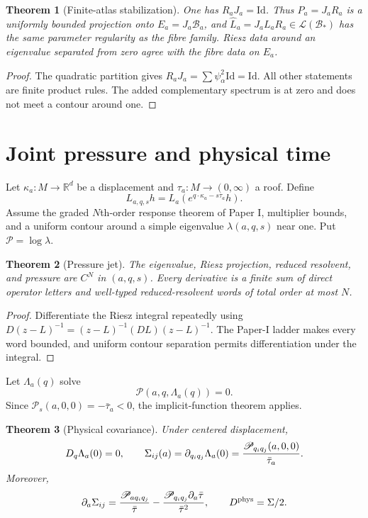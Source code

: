 \documentclass[11pt,reqno]{amsart}
\newtheorem{theorem}{Theorem}[section]
\theoremstyle{definition}
\theoremstyle{remark}
\newcommand{\B}{\mathcal B}
\newcommand{\R}{\mathbb R}
\newcommand{\Id}{\mathrm{Id}}
\begin{document}
\begin{theorem}[Finite-atlas stabilization]\label{thm:bundle}
One has $R_aJ_a=\Id$.  Thus $P_a=J_aR_a$ is a uniformly bounded projection
onto $E_a=J_a\B_a$, and
$\widehat L_a=J_aL_aR_a\in\mathcal L(\B_*)$ has the same parameter
regularity as the fibre family.  Riesz data around an eigenvalue separated
from zero agree with the fibre data on $E_a$.
\end{theorem}

\begin{proof}
The quadratic partition gives $R_aJ_a=\sum\psi_\alpha^2\Id=\Id$.
All other statements are finite product rules.  The added complementary
spectrum is at zero and does not meet a contour around one.
\end{proof}

\section{Joint pressure and physical time}\label{sec:pressure}
Let $\kappa_a:M\to\R^d$ be a displacement and
$\tau_a:M\to(0,\infty)$ a roof.  Define
\[
 L_{a,q,s}h=L_a(e^{q\cdot\kappa_a-s\tau_a}h).
\]
Assume the graded $N$th-order response theorem of Paper I, multiplier bounds,
and a uniform contour around a simple eigenvalue $\lambda(a,q,s)$ near one.
Put $\mathscr P=\log\lambda$.

\begin{theorem}[Pressure jet]\label{thm:pressure}
The eigenvalue, Riesz projection, reduced resolvent, and pressure are $C^N$ in
$(a,q,s)$.  Every derivative is a finite sum of direct operator letters and
well-typed reduced-resolvent words of total order at most $N$.
\end{theorem}

\begin{proof}
Differentiate the Riesz integral repeatedly using
$D(z-L)^{-1}=(z-L)^{-1}(DL)(z-L)^{-1}$.  The Paper-I ladder makes every word
bounded, and uniform contour separation permits differentiation under the
integral.
\end{proof}

Let $\Lambda_a(q)$ solve
\[
 \mathscr P(a,q,\Lambda_a(q))=0.
\]
Since $\mathscr P_s(a,0,0)=-\bar\tau_a<0$, the implicit-function theorem
applies.

\begin{theorem}[Physical covariance]\label{thm:physical}
Under centered displacement,
\[
 D_q\Lambda_a(0)=0,
 \qquad
 \Sigma_{ij}(a)=\partial_{q_iq_j}\Lambda_a(0)
 ={\mathscr P_{q_iq_j}(a,0,0)\over\bar\tau_a}.
\]
Moreover,
\[
 \partial_a\Sigma_{ij}
 ={\mathscr P_{aq_iq_j}\over\bar\tau}
 -{\mathscr P_{q_iq_j}\partial_a\bar\tau\over\bar\tau^2},
 \qquad D^{\rm phys}=\Sigma/2.
\]
\end{theorem}
\end{document}
